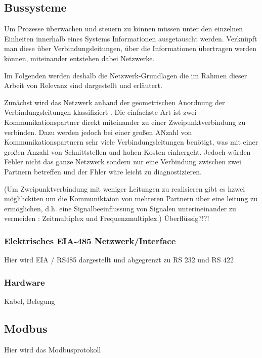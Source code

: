 \subsection{Bussysteme} 
Um Prozesse überwachen und steuern zu können müssen unter den einzelnen Einheiten innerhalb eines Systems Informationen ausgetauscht werden. Verknüpft man diese über Verbindungsleitungen, über die Informationen übertragen werden können, miteinander entstehen dabei Netzwerke.

Im Folgenden werden deshalb die Netzwerk-Grundlagen die im Rahmen dieser Arbeit von Relevanz sind dargestellt und erläutert.

Zunächst wird das Netzwerk anhand der geometrischen Anordnung der Verbindungsleitungen klassifiziert \cite[S.~1f.]{schn06}. 
Die einfachste Art ist zwei Kommunikationspartner direkt miteinander zu einer Zweipunktverbindung zu verbinden. Dazu werden jedoch bei einer großen ANzahl von Kommunikationspartnern sehr viele Verbindungsleitungen benötigt, was mit einer großen Anzahl von Schnittstellen und hohen Kosten einhergeht. Jedoch würden Fehler nicht das ganze Netzwerk sondern nur eine Verbindung zwischen zwei Partnern betreffen und der Fhler wäre leicht zu diagnostizieren.

(Um Zweipunktverbindung mit weniger Leitungen zu realisieren gibt es hzwei möglihckiten um die Kommuniktaion von mehreren Partnern über eine leitung zu ermöglichen, d.h. eine Signalbeeinflussung von Signalen unterineinander zu vermeiden : Zeitmultiplex und Frequenzmultiplex.) Überflüssig?!?!




\subsubsection{Elektrisches EIA-485 Netzwerk/Interface}
Hier wird EIA / RS485 dargestellt und abgegrenzt zu RS 232 und RS 422

\subsubsection{Hardware}
Kabel, Belegung



\subsection{Modbus}



Hier wird das Modbusprotokoll



